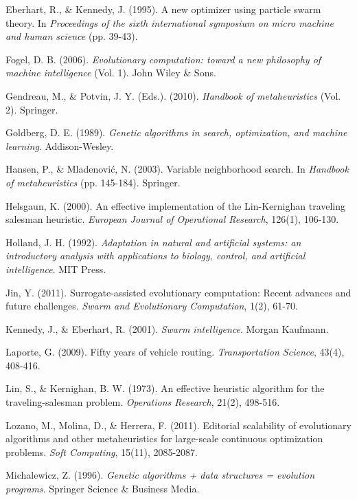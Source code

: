 \documentclass[12pt,a4paper]{article}
\begin{document}
\begin{thebibliography}{99}
Eberhart, R., \& Kennedy, J. (1995). A new optimizer using particle swarm theory. In \textit{Proceedings of the sixth international symposium on micro machine and human science} (pp. 39-43).

Fogel, D. B. (2006). \textit{Evolutionary computation: toward a new philosophy of machine intelligence} (Vol. 1). John Wiley \& Sons.

Gendreau, M., \& Potvin, J. Y. (Eds.). (2010). \textit{Handbook of metaheuristics} (Vol. 2). Springer.

Goldberg, D. E. (1989). \textit{Genetic algorithms in search, optimization, and machine learning}. Addison-Wesley.

Hansen, P., \& Mladenović, N. (2003). Variable neighborhood search. In \textit{Handbook of metaheuristics} (pp. 145-184). Springer.

Helsgaun, K. (2000). An effective implementation of the Lin-Kernighan traveling salesman heuristic. \textit{European Journal of Operational Research}, 126(1), 106-130.

Holland, J. H. (1992). \textit{Adaptation in natural and artificial systems: an introductory analysis with applications to biology, control, and artificial intelligence}. MIT Press.

Jin, Y. (2011). Surrogate-assisted evolutionary computation: Recent advances and future challenges. \textit{Swarm and Evolutionary Computation}, 1(2), 61-70.

Kennedy, J., \& Eberhart, R. (2001). \textit{Swarm intelligence}. Morgan Kaufmann.

Laporte, G. (2009). Fifty years of vehicle routing. \textit{Transportation Science}, 43(4), 408-416.

Lin, S., \& Kernighan, B. W. (1973). An effective heuristic algorithm for the traveling-salesman problem. \textit{Operations Research}, 21(2), 498-516.

Lozano, M., Molina, D., \& Herrera, F. (2011). Editorial scalability of evolutionary algorithms and other metaheuristics for large-scale continuous optimization problems. \textit{Soft Computing}, 15(11), 2085-2087.

Michalewicz, Z. (1996). \textit{Genetic algorithms + data structures = evolution programs}. Springer Science \& Business Media.


\end{thebibliography}
\end{document}
